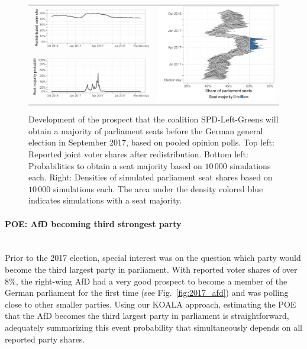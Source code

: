 \documentclass[smallcondensed]{svjour3}     %
\begin{document}
\begin{figure}[H]\centering
\begin{tabular}{ll}
\includegraphics[height=.15\textwidth]{figures/2017_pooled_spdleftgreens_rawSharesRedist.pdf}
&
\multirow{2}{*}[13ex]{\includegraphics[height=30ex]{figures/2017_pooled_spdleftgreens_ridgeline.pdf}}
\\
\includegraphics[height=.15\textwidth]{figures/2017_pooled_spdleftgreens_prob.pdf}
\end{tabular}
\caption{Development of the prospect that the coalition SPD-Left-Greens will
obtain a majority of parliament seats before the German
general election in September 2017, based on pooled opinion polls.
Top left: Reported joint voter shares after redistribution.
Bottom left: Probabilities to obtain a seat majority based on $10\,000$ simulations each.
Right: Densities of simulated parliament seat shares based on $10\,000$ simulations each.
The area under the density colored blue indicates simulations with a seat majority.
\label{fig:2017_spdleftgreens}
}
\end{figure}

\paragraph{POE: AfD becoming third strongest party} \ \\
Prior to the 2017 election, special interest was on the question
which party would become the third largest party in parliament.
With reported voter shares of over $8\%$, the right-wing AfD had a very good
prospect to become a member of the German parliament for the first time
(see Fig.~\ref{fig:2017_afd}) and was polling close to other smaller parties.
Using our KOALA approach, estimating the POE that the AfD becomes
the third largest party in parliament is straightforward, adequately summarizing
this event probability that simultaneously depends on all reported party shares.
\end{document}
